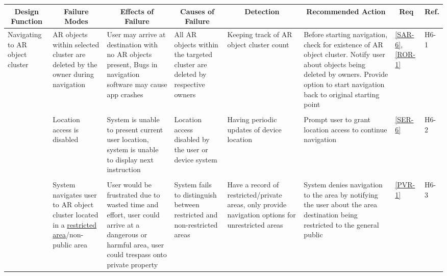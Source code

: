 \documentclass{article}
\begin{document}
\begin{landscape}
\begin{table}[hp]
    \centering
    \begin{footnotesize}
    \begin{tabular}{|p{1in}|p{1in}|p{1.5in}|p{1.5in}|p{1.5in}|p{2in}|p{0.4in}|p{0.4in}|}
        \hline
        \multicolumn{1}{|c|}{\textbf{Design Function}} & \multicolumn{1}{c|}{\textbf{Failure Modes}} & \multicolumn{1}{c|}{\textbf{Effects of Failure}} & \multicolumn{1}{c|}{\textbf{Causes of Failure}} & \multicolumn{1}{|c|}{\textbf{Detection}} & \multicolumn{1}{c|}{\textbf{Recommended Action}} & \multicolumn{1}{c|}{\textbf{Req}} & \multicolumn{1}{c|}{\textbf{Ref.}} \\
        \hline
        Navigating to AR object cluster & AR objects within selected cluster are deleted by the owner during navigation & User may arrive at destination with no AR objects present, Bugs in navigation software may cause app crashes & All AR objects within the targeted cluster are deleted by respective owners & Keeping track of AR object cluster count & Before starting navigation, check for existence of AR object cluster. Notify user about objects being deleted by owners. Provide option to start navigation back to original starting point & \ref{SAR-6}, \ref{ROR-1} & H6-1 \\
        & & & & & & & \\
        & Location access is disabled & System is unable to present current user location, system is unable to display next instruction & Location access disabled by the user or device system & Having periodic updates of device location & Prompt user to grant location access to continue navigation & \ref{SER-6} & H6-2 \\
        & & & & & & & \\
        & System navigates user to AR object cluster located in a \hyperref[ssub:def]{restricted area}/non-public area & User would be frustrated due to wasted time and effort, user could arrive at a dangerous or harmful area, user could trespass onto private property & System fails to distinguish between restricted and non-restricted areas & Have a record of restricted/private areas, only provide navigation options for unrestricted areas & System denies navigation to the area by notifying the user about the area destination being restricted to the general public & \ref{PVR-1} & H6-3 \\
        \hline
    \end{tabular}
    \end{footnotesize}
\end{table}
\end{landscape}
\restoregeometry
\end{document}
